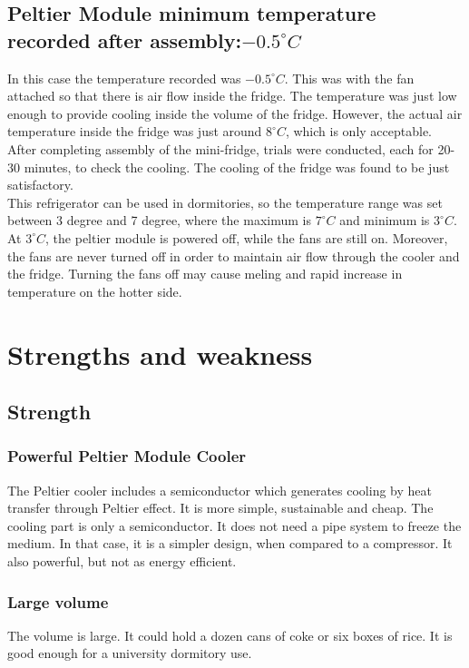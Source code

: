 \documentclass[12pt,onecolumn]{article}
\begin{document}
\subsection{Peltier Module minimum temperature recorded after assembly:$-0.5^{\circ}C$} 
In this case the temperature recorded was $-0.5^{\circ}C$. This was with the fan attached so that there is air flow inside the fridge. The temperature was just low enough to provide cooling inside the volume of the fridge. However, the actual air temperature inside the fridge was just around $8^{\circ}C$, which is only acceptable. \\
After completing assembly of the mini-fridge, trials were conducted, each for 20-30 minutes, to check the cooling. The cooling of the fridge was found to be just satisfactory. \\
This refrigerator can be used in dormitories, so the temperature range was set between 3 degree and 7 degree, where the maximum is $7^{\circ}C$ and minimum is $3^{\circ}C$. At $3^{\circ}C$, the peltier module is powered off, while the fans are still on. Moreover, the fans are never turned off in order to maintain air flow through the cooler and the fridge. Turning the fans off may cause meling and rapid increase in temperature on the hotter side. 

\section{Strengths and weakness}
\subsection{Strength}
\subsubsection{Powerful Peltier Module Cooler}
The Peltier cooler includes a semiconductor which generates cooling by heat transfer through Peltier effect. It is more simple, sustainable and cheap. The cooling part is only a semiconductor. It does not need a pipe system to freeze the medium. In that case, it is a simpler design, when compared to a compressor. It also powerful, but not as energy efficient. 
\subsubsection{Large volume}
The volume is large. It could hold a dozen cans of coke or six boxes of rice. It is good enough for a university dormitory use.  
\end{document}
